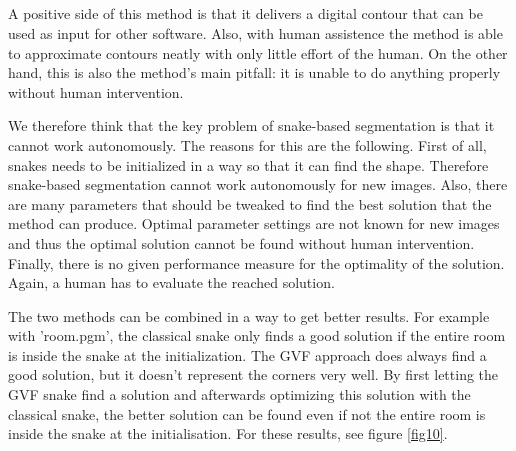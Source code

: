 \documentclass{article}
\begin{document}
\subsection{}
A positive side of this method is that it delivers a digital contour that can be used as input for other software. Also, with human assistence the method is able to approximate contours neatly with only little effort of the human. On the other hand, this is also the method's main pitfall: it is unable to do anything properly without human intervention.

We therefore think that the key problem of snake-based segmentation is that it cannot work autonomously. The reasons for this are the following.
First of all, snakes needs to be initialized in a way so that it can find the shape. Therefore snake-based segmentation cannot work autonomously for new images. 
Also, there are many parameters that should be tweaked to find the best solution that the method can produce. Optimal parameter settings are not known for new images and thus the optimal solution cannot be found without human intervention.
Finally, there is no given performance measure for the optimality of the solution. Again, a human has to evaluate the reached solution.

The two methods can be combined in a way to get better results. For example with 'room.pgm', the classical snake only finds a good solution if the entire room is inside the snake at the initialization. The GVF approach does always find a good solution, but it doesn't represent the corners very well. By first letting the GVF snake find a solution and afterwards optimizing this solution with the classical snake, the better solution can be found even if not the entire room is inside the snake at the initialisation. For these results, see figure \ref{fig10}.
\end{document}

